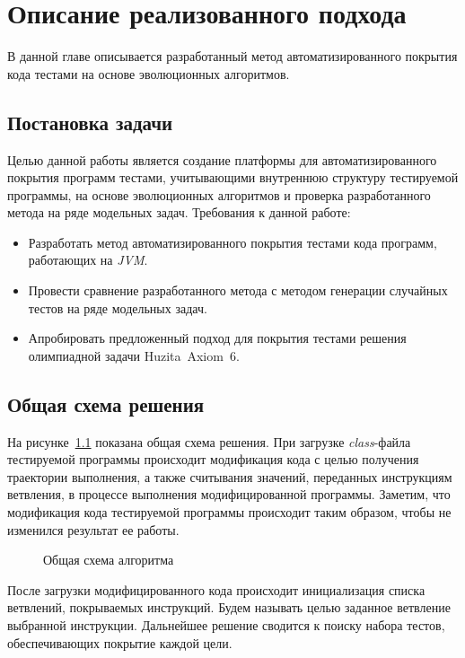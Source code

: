 \chapter{Описание реализованного подхода}
\label{chapter2}

В данной главе описывается разработанный метод автоматизированного покрытия кода тестами на основе эволюционных алгоритмов.

\section{Постановка задачи}
Целью данной работы является создание платформы для автоматизированного покрытия программ тестами, учитывающими внутреннюю структуру тестируемой программы, на 
основе эволюционных алгоритмов и проверка разработанного метода на ряде модельных задач. Требования к данной работе:
\begin{itemize}
 \item Разработать метод автоматизированного покрытия тестами кода программ, работающих на \textit{JVM}.
 \item Провести сравнение разработанного метода с методом генерации случайных тестов на ряде модельных задач.
 \item Апробировать предложенный подход для покрытия тестами решения олимпиадной задачи Huzita~Axiom~6. 
\end{itemize}

\section{Общая схема решения}


На рисунке~\ref{pipeline} показана общая схема решения. При загрузке \textit{class}-файла тестируемой программы происходит модификация кода с целью получения 
траектории выполнения, а также считывания значений, переданных инструкциям ветвления, в процессе выполнения модифицированной программы. Заметим, что модификация 
кода тестируемой программы происходит таким образом, чтобы не изменился результат ее работы.

\begin{figure}[h!]
  \caption{Общая схема алгоритма}
  \label{pipeline}
\end{figure} 

После загрузки модифицированного кода происходит инициализация списка ветвлений, покрываемых инструкций. Будем называть целью заданное ветвление выбранной 
инструкции. Дальнейшее решение сводится к поиску набора тестов, обеспечивающих покрытие каждой цели.

